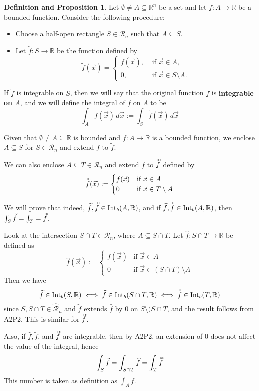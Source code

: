 \documentclass[11pt]{article}
\makeatletter
\theoremstyle{definition}
\newtheorem{defnprop}[thm]{Definition and Proposition}
\newcommand{\R}{\ensuremath{\mathbb{R}}}
\newcommand{\dbtilde}[1]{\accentset{\approx}{#1}}
\newenvironment{pf}[1][\proofname]{\par
  \pushQED{\qed}%
  \normalfont \topsep0\p@\relax
  \trivlist
  \item[\hskip\labelsep\itshape
  #1\@addpunct{.}]\ignorespaces
}{%
  \popQED\endtrivlist\@endpefalse
}
\makeatother
\begin{document}
\begin{defnprop}
Let $\emptyset \ne A \subseteq \R^n$ be a set and let $f : A \to \R$ be a bounded function. Consider the following procedure: \vspace{-1.5ex}
\begin{itemize}
    \item Choose a half-open rectangle $S \in \mathcal{R}_n$ such that $A \subseteq S$.
    \item Let $\widetilde{f} : S \to \R$ be the function defined by
    $$\widetilde{f} (\vec{x}) = \begin{cases} f(\vec{x}), & \text{ if } \vec{x} \in A, \\ 0, & \text{ if } \vec{x} \in S \setminus A. \end{cases}$$
\end{itemize}
\vspace{-1.5ex}
If $\widetilde{f}$ is integrable on $S$, then we will say that the original function $f$ is {\bf integrable on $A$}, and we will define the integral of $f$ on $A$ to be
$$\int_A f(\vec{x})\,d\vec{x} := \int_S \widetilde{f}(\vec{x})\,d\vec{x}$$
\end{defnprop}
\begin{pf}
Given that $\emptyset \neq A \subseteq \R$ is bounded and $f : A \to \R$ is a bounded function, we enclose $A \subseteq S$ for $S \in \mathcal{R}_n$ and extend $f$ to $\widetilde{f}$. 

We can also enclose $A \subseteq T \in \mathcal{R}_n$ and extend $f$ to $\dbtilde{f}$ defined by
$$\dbtilde{f}(\vec{x}) := \begin{cases} f(\vec{x}) & \text{if } \vec{x} \in A \\ 0 & \text{if } \vec{x} \in T \setminus A \end{cases}$$

We will prove that indeed, $\widetilde{f}, \dbtilde{f} \in {\rm Int}_b(A, \R)$, and if $\widetilde{f}, \dbtilde{f} \in {\rm Int}_b(A, \R)$, then $\int_S \widetilde{f} = \int_T = \dbtilde{f}$. 

Look at the intersection $S \cap T \in \mathcal{R}_n$, where $A \subseteq S \cap T$. Let $\widehat{f} : S \cap T \to \R$ be defined as
$$\widehat{f}(\vec{x}) := \begin{cases} f(\vec{x}) & \text{if } \vec{x} \in A \\ 0 & \text{if } \vec{x} \in (S \cap T) \setminus A \end{cases}$$
Then we have
$$\widetilde{f} \in {\rm Int}_b(S, \R) \iff \widehat{f} \in {\rm Int}_b(S \cap T, \R) \iff \dbtilde{f} \in {\rm Int}_b(T, \R)$$
since $S, S \cap T \in \widehat{\mathcal{R}}_n$ and $\widetilde{f}$ extends $\widehat{f}$ by 0 on $S \setminus (S \cap T$, and the result follows from A2P2. This is similar for $\dbtilde{f}$.

Also, if $\widehat{f}, \widetilde{f}$, and $\dbtilde{f}$ are integrable, then by A2P2, an extension of 0 does not affect the value of the integral, hence
$$\int_S \widetilde{f} = \int_{S \cap T} \widehat{f} = \int_T \dbtilde{f}$$
This number is taken as definition as $\int_A f$.
\end{pf}
\end{document}
